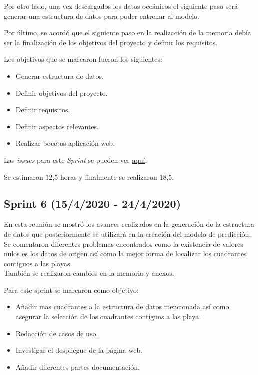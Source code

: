 Por otro lado, una vez descargados los datos oceánicos el siguiente paso será generar una estructura de datos para poder entrenar al modelo.

Por último, se acordó que el siguiente paso en la realización de la memoria debía ser la finalización de los objetivos del proyecto y definir los requisitos.

Los objetivos que se marcaron fueron los siguientes:
\begin{itemize}
	\item Generar estructura de datos.
	\item Definir objetivos del proyecto.
	\item Definir requisitos.
	\item Definir aspectos relevantes.
	\item Realizar bocetos aplicación web.
\end{itemize}

Las \emph{issues} para este \emph{Sprint} se pueden ver \href{https://github.com/psnti/TFG-Pablo-Santidrian-Tudanca/milestone/5}{aquí}.


Se estimaron 12,5 horas y finalmente se realizaron 18,5.

\subsection{Sprint 6 (15/4/2020 - 24/4/2020)}\label{Sprint-6}

En esta reunión se mostró los avances realizados en la generación de la estructura de datos que posteriormente se utilizará en la creación del modelo de predicción. Se comentaron diferentes problemas encontrados como la existencia de valores nulos es los datos de origen así como la mejor forma de localizar los cuadrantes contiguos a las playas.\\
También se realizaron cambios en la memoria y anexos.

Para este sprint se marcaron como objetivo:
\begin{itemize}
	\item Añadir mas cuadrantes a la estructura de datos mencionada así como asegurar la selección de los cuadrantes contiguos a las playa.
	\item Redacción de casos de uso.
	\item Investigar el despliegue de la página web.
	\item Añadir diferentes partes  documentación.
\end{itemize} 

